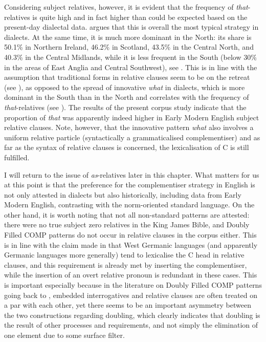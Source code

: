 Considering subject relatives, however, it is evident that the frequency of \textit{that}-relatives is quite high and in fact higher than could be expected based on the present-day dialectal data. \citet[24]{herrmann2005} argues that this is overall the most typical strategy in dialects. At the same time, it is much more dominant in the North: its share is 50.1\% in Northern Ireland, 46.2\% in Scotland, 43.5\% in the Central North, and 40.3\% in the Central Midlands, while it is less frequent in the South (below 30\% in the areas of East Anglia and Central Southwest), see \citet[27, Table 1]{herrmann2005}. This is in line with the assumption that traditional forms in relative clauses seem to be on the retreat (see \citealt[291--292]{kortmannwagner2007}), as opposed to the spread of innovative \textit{what} in dialects, which is more dominant in the South than in the North and correlates with the frequency of \textit{that}-relatives (see \citealt[27, Table 1]{herrmann2005}). The results of the present corpus study indicate that the proportion of \textit{that} was apparently indeed higher in Early Modern English subject relative clauses. Note, however, that the innovative pattern \textit{what} also involves a uniform relative particle (syntactically a grammaticalised complementiser) and as far as the syntax of relative clauses is concerned, the lexicalisation of C is still fulfilled.

I will return to the issue of \textit{as}-relatives later in this chapter. What matters for us at this point is that the preference for the complementiser strategy in English is not only attested in dialects but also historically, including data from Early Modern English, contrasting with the norm-oriented standard language. On the other hand, it is worth noting that not all non-standard patterns are attested: there were no true subject zero relatives in the King James Bible, and Doubly Filled COMP patterns do not occur in relative clauses in the corpus either. This is in line with the claim made in  that West Germanic languages (and apparently Germanic languages more generally) tend to lexicalise the C head in relative clauses, and this requirement is already met by inserting the complementiser, while the insertion of an overt relative pronoun is redundant in these cases. This is important especially because in the literature on Doubly Filled COMP patterns going back to \citet{chomskylasnik1977}, embedded interrogatives and relative clauses are often treated on a par with each other, yet there seems to be an important asymmetry between the two constructions regarding doubling, which clearly indicates that doubling is the result of other processes and requirements, and not simply the elimination of one element due to some surface filter.

